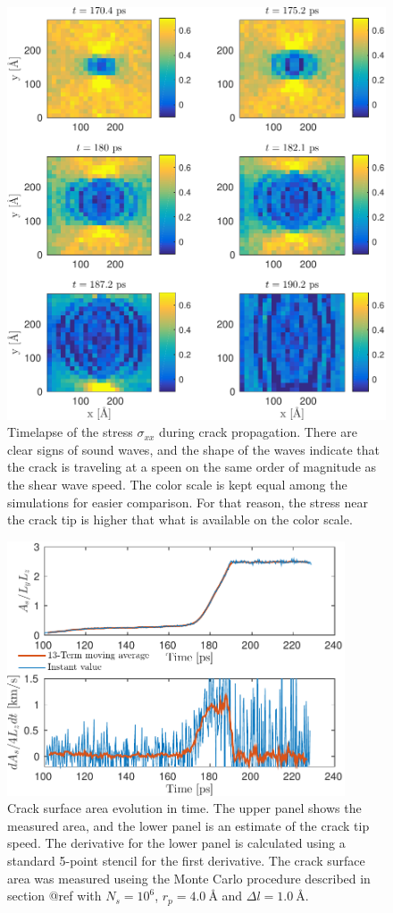 \begin{figure}
\includegraphics[width=\textwidth]{../figures/thesis/stressfield_timelapse.pdf}
\caption{Timelapse of the stress $\sigma_{xx}$ during crack propagation. There are clear signs of sound waves, and the shape of the waves indicate that the crack is traveling at a speen on the same order of magnitude as the shear wave speed. The color scale is kept equal among the simulations for easier comparison. For that reason, the stress near the crack tip is higher that what is available on the color scale.}
\end{figure}

\begin{figure}
\centering
\includegraphics[width=10cm]{../figures/thesis/crack_area_evolution_1048.pdf}
\caption{Crack surface area evolution in time. The upper panel shows the measured area, and the lower panel is an estimate of the crack tip speed. The derivative for the lower panel is calculated using a standard 5-point stencil for the first derivative. The crack surface area was measured useing the Monte Carlo procedure described in section @ref with $N_s = 10^6$, $r_p = \SI{4.0}{\angstrom}$ and $\Delta l = \SI{1.0}{\angstrom}$. }
\end{figure}

